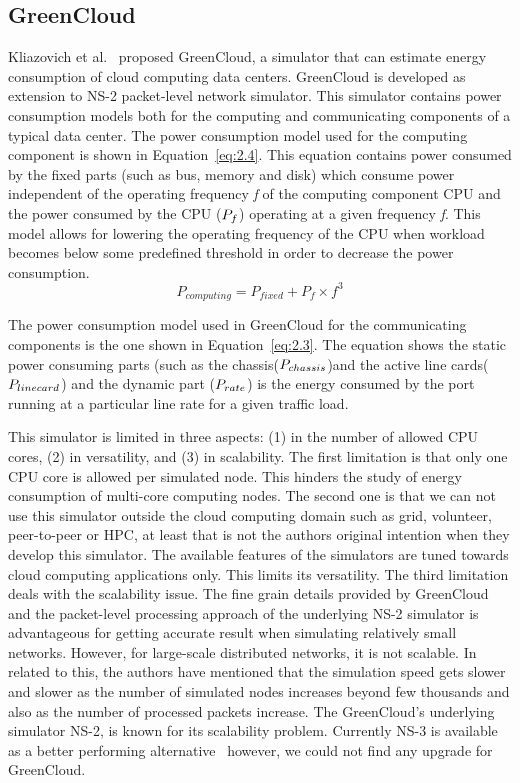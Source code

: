 \subsection{GreenCloud}
Kliazovich et al.~\cite{DBLP:journals/tjs/KliazovichBK12} proposed GreenCloud, a simulator that can estimate energy consumption of cloud computing data centers. GreenCloud is developed as extension to NS-2 packet-level network simulator. This simulator contains power consumption models both for the computing and communicating components of a typical data center. The power consumption model used for the computing component is shown in Equation~\ref{eq:2.4}. This equation contains power consumed by the fixed parts (such as bus, memory and disk) which consume power independent of the operating frequency \emph{f} of the computing component CPU and the power consumed by the CPU (\($$P_f$$\)) operating at a given frequency \emph{f}. This model allows for lowering the operating frequency of the CPU when workload becomes below some predefined threshold in order to decrease the power consumption. 
\begin{equation} \label{eq:2.4}
P_{computing} = P_{fixed} + P_f \times f^3
\end{equation}

The power consumption model used in GreenCloud for the communicating components is the one shown in Equation~\ref{eq:2.3}. The equation shows the static power consuming parts (such as the chassis(\($$P_{chassis}$$\))and the active line cards(\($$P_{linecard}$$\)) and the dynamic part (\($$P_{rate}$$\)) is the energy consumed by the port running at a particular line rate for a given traffic load. 

This simulator is limited in three aspects: (1) in the number of allowed CPU cores, (2) in versatility, and (3) in scalability. The first limitation is that only one CPU core is allowed per simulated node. This hinders the study of energy consumption of multi-core computing nodes. The second one is that we can not use this simulator outside the cloud computing domain such as grid, volunteer, peer-to-peer or HPC, at least that is not the authors original intention when they develop this simulator. The available features of the simulators are tuned towards cloud computing applications only. This limits its versatility. The third limitation deals with the scalability issue. The fine grain details provided by GreenCloud and the packet-level processing approach of the underlying NS-2 simulator is advantageous for getting accurate result when simulating relatively small networks. However, for large-scale distributed networks, it is not scalable. In related to this, the authors have mentioned that the simulation speed gets slower and slower as the number of simulated nodes increases beyond few thousands and also as the number of processed packets increase. The GreenCloud's underlying simulator NS-2, is known for its scalability problem. Currently NS-3 is available as a better performing alternative~\cite{DBLP:conf/icc/WeingartnerLW09} however, we could not find any upgrade for GreenCloud.

